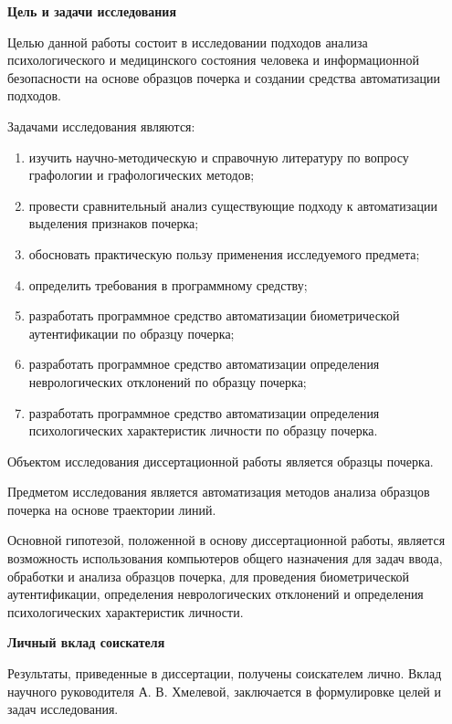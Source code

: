 \label{sec:general_overview}

\newcommand{\totpages}{\number\numexpr\getpagerefnumber{LastPage}}

\textbf{Цель и задачи исследования}
\bigskip

Целью данной работы состоит в исследовании подходов анализа психологического и медицинского состояния человека и информационной безопасности на основе образцов почерка и создании средства автоматизации подходов.

Задачами исследования являются:
\begin{enumerate}
  \item изучить научно-методическую и справочную литературу по вопросу графологии и графологических методов;
  \item провести сравнительный анализ существующие подходу к автоматизации выделения признаков почерка;
  \item обосновать практическую пользу применения исследуемого \mbox{предмета};
  \item определить требования в программному средству;
  \item разработать программное средство автоматизации биометрической аутентификации по образцу почерка;
  \item разработать программное средство автоматизации определения неврологических отклонений по образцу почерка;
  \item разработать программное средство автоматизации определения психологических характеристик личности по образцу почерка.
\end{enumerate}

Объектом исследования диссертационной работы является образцы \mbox{почерка}.

Предметом исследования является автоматизация методов анализа образцов почерка на основе траектории линий.

Основной гипотезой, положенной в основу диссертационной работы, является возможность использования компьютеров общего назначения для задач ввода, обработки и анализа образцов почерка, для проведения биометрической аутентификации, определения неврологических отклонений и определения психологических характеристик личности. 

\bigskip
\textbf{Личный вклад соискателя}
\bigskip

Результаты, приведенные в диссертации, получены  соискателем лично. Вклад научного руководителя А. В. Хмелевой, заключается в формулировке целей и задач исследования.

